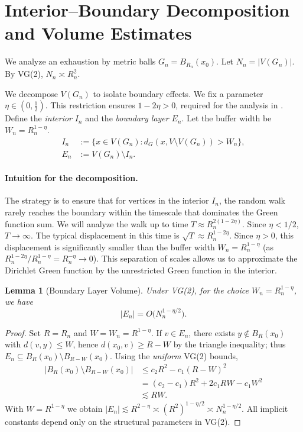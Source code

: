 \documentclass{article}
\numberwithin{equation}{section}
\newtheorem{lemma}[theorem]{Lemma}
\theoremstyle{definition}
\theoremstyle{remark}
\begin{document}
\section{Interior--Boundary Decomposition and Volume Estimates}\label{sec:decomposition}

We analyze an exhaustion by metric balls $G_n = B_{R_n}(x_0)$. Let $N_n = |V(G_n)|$. By VG(2), $N_n \asymp R_n^2$.

We decompose $V(G_n)$ to isolate boundary effects.
We fix a parameter $\eta \in (0, \frac{1}{2})$. This restriction ensures $1-2\eta>0$, required for the analysis in . Define the \emph{interior} $I_n$ and the \emph{boundary layer} $E_n$. Let the buffer width be $W_n = R_n^{1-\eta}$.
\begin{align*}
I_n &:= \{x \in V(G_n) : d_G(x, V \setminus V(G_n)) > W_n\}, \\
E_n &:= V(G_n) \setminus I_n.
\end{align*}

\paragraph{Intuition for the decomposition.} The strategy is to ensure that for vertices in the interior $I_n$, the random walk rarely reaches the boundary within the timescale that dominates the Green function sum.
We will analyze the walk up to time $T \approx R_n^{2(1-2\eta)}$. Since $\eta < 1/2$, $T \to \infty$.
The typical displacement in this time is $\sqrt{T} \approx R_n^{1-2\eta}$. Since $\eta>0$, this displacement is significantly smaller than the buffer width $W_n = R_n^{1-\eta}$ (as $R_n^{1-2\eta} / R_n^{1-\eta} = R_n^{-\eta} \to 0$). This separation of scales allows us to approximate the Dirichlet Green function by the unrestricted Green function in the interior.

\begin{lemma}[Boundary Layer Volume]\label{lem:boundary_volume}
Under VG(2), for the choice $W_n = R_n^{1-\eta}$, we have
\[
    |E_n| = O\bigl(N_n^{1-\eta/2}\bigr).
\]
\end{lemma}
\begin{proof}
Set $R=R_n$ and $W=W_n=R^{1-\eta}$. If $v\in E_n$, there exists $y\notin B_R(x_0)$ with $d(v,y)\le W$, hence
$d(x_0,v)\ge R-W$ by the triangle inequality; thus $E_n\subseteq B_R(x_0)\setminus B_{R-W}(x_0)$. Using the \emph{uniform} VG(2) bounds,
\begin{align*}
|B_R(x_0)\setminus B_{R-W}(x_0)| &\le c_2 R^2 - c_1 (R-W)^2 \\
  &= (c_2-c_1)R^2 + 2c_1 R W - c_1 W^2 \\
  &\lesssim R W.
\end{align*}
With $W=R^{1-\eta}$ we obtain $|E_n|\lesssim R^{2-\eta}\asymp (R^2)^{1-\eta/2} \asymp N_n^{1-\eta/2}$.
All implicit constants depend only on the structural parameters in VG(2).
\end{proof}
\end{document}
